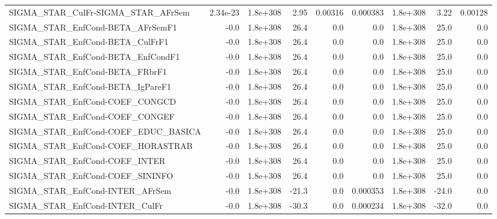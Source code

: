 \begin{tabular}{lrrrrrrrr}
SIGMA\_STAR\_CulFr-SIGMA\_STAR\_AFrSem   &    2.34e-23 &     1.8e+308 &    2.95 &  0.00316 &   0.000383 &    1.8e+308 &         3.22 &       0.00128 \\
SIGMA\_STAR\_EnfCond-BETA\_AFrSemF1     &        -0.0 &     1.8e+308 &    26.4 &      0.0 &        0.0 &    1.8e+308 &         25.0 &           0.0 \\
SIGMA\_STAR\_EnfCond-BETA\_CulFrF1      &        -0.0 &     1.8e+308 &    26.4 &      0.0 &        0.0 &    1.8e+308 &         25.0 &           0.0 \\
SIGMA\_STAR\_EnfCond-BETA\_EnfCondF1    &        -0.0 &     1.8e+308 &    26.4 &      0.0 &        0.0 &    1.8e+308 &         25.0 &           0.0 \\
SIGMA\_STAR\_EnfCond-BETA\_FRbrF1       &        -0.0 &     1.8e+308 &    26.4 &      0.0 &        0.0 &    1.8e+308 &         25.0 &           0.0 \\
SIGMA\_STAR\_EnfCond-BETA\_IgPareF1     &        -0.0 &     1.8e+308 &    26.4 &      0.0 &        0.0 &    1.8e+308 &         25.0 &           0.0 \\
SIGMA\_STAR\_EnfCond-COEF\_CONGCD       &        -0.0 &     1.8e+308 &    26.4 &      0.0 &        0.0 &    1.8e+308 &         25.0 &           0.0 \\
SIGMA\_STAR\_EnfCond-COEF\_CONGEF       &        -0.0 &     1.8e+308 &    26.4 &      0.0 &        0.0 &    1.8e+308 &         25.0 &           0.0 \\
SIGMA\_STAR\_EnfCond-COEF\_EDUC\_BASICA  &        -0.0 &     1.8e+308 &    26.4 &      0.0 &        0.0 &    1.8e+308 &         25.0 &           0.0 \\
SIGMA\_STAR\_EnfCond-COEF\_HORASTRAB    &        -0.0 &     1.8e+308 &    26.4 &      0.0 &        0.0 &    1.8e+308 &         25.0 &           0.0 \\
SIGMA\_STAR\_EnfCond-COEF\_INTER        &        -0.0 &     1.8e+308 &    26.4 &      0.0 &        0.0 &    1.8e+308 &         25.0 &           0.0 \\
SIGMA\_STAR\_EnfCond-COEF\_SININFO      &        -0.0 &     1.8e+308 &    26.4 &      0.0 &        0.0 &    1.8e+308 &         25.0 &           0.0 \\
SIGMA\_STAR\_EnfCond-INTER\_AFrSem      &        -0.0 &     1.8e+308 &   -21.3 &      0.0 &   0.000353 &    1.8e+308 &        -24.0 &           0.0 \\
SIGMA\_STAR\_EnfCond-INTER\_CulFr       &        -0.0 &     1.8e+308 &   -30.3 &      0.0 &   0.000234 &    1.8e+308 &        -32.0 &           0.0 \\

\end{tabular}
